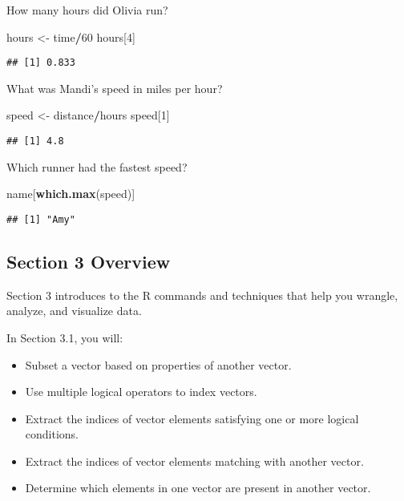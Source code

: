 \documentclass[]{article}
\newenvironment{Shaded}{\begin{snugshade}}{\end{snugshade}}
\newcommand{\DecValTok}[1]{\textcolor[rgb]{0.00,0.00,0.81}{#1}}
\newcommand{\KeywordTok}[1]{\textcolor[rgb]{0.13,0.29,0.53}{\textbf{#1}}}
\newcommand{\NormalTok}[1]{#1}
\newcommand{\OperatorTok}[1]{\textcolor[rgb]{0.81,0.36,0.00}{\textbf{#1}}}
\newcommand{\StringTok}[1]{\textcolor[rgb]{0.31,0.60,0.02}{#1}}
\providecommand{\tightlist}{%
  \setlength{\itemsep}{0pt}\setlength{\parskip}{0pt}}
\begin{document}
How many hours did Olivia run?

\begin{Shaded}
\begin{Highlighting}[]
\NormalTok{hours <-}\StringTok{ }\NormalTok{time}\OperatorTok{/}\DecValTok{60}
\NormalTok{hours[}\DecValTok{4}\NormalTok{]}
\end{Highlighting}
\end{Shaded}

\begin{verbatim}
## [1] 0.833
\end{verbatim}

What was Mandi's speed in miles per hour?

\begin{Shaded}
\begin{Highlighting}[]
\NormalTok{speed <-}\StringTok{ }\NormalTok{distance}\OperatorTok{/}\NormalTok{hours}
\NormalTok{speed[}\DecValTok{1}\NormalTok{]}
\end{Highlighting}
\end{Shaded}

\begin{verbatim}
## [1] 4.8
\end{verbatim}

Which runner had the fastest speed?

\begin{Shaded}
\begin{Highlighting}[]
\NormalTok{name[}\KeywordTok{which.max}\NormalTok{(speed)]}
\end{Highlighting}
\end{Shaded}

\begin{verbatim}
## [1] "Amy"
\end{verbatim}

\hypertarget{section-3-overview}{%
\subsection{Section 3 Overview}\label{section-3-overview}}

Section 3 introduces to the R commands and techniques that help you
wrangle, analyze, and visualize data.

In Section 3.1, you will:

\begin{itemize}
\tightlist
\item
  Subset a vector based on properties of another vector.
\item
  Use multiple logical operators to index vectors.
\item
  Extract the indices of vector elements satisfying one or more logical
  conditions.
\item
  Extract the indices of vector elements matching with another vector.
\item
  Determine which elements in one vector are present in another vector.
\end{itemize}
\end{document}
